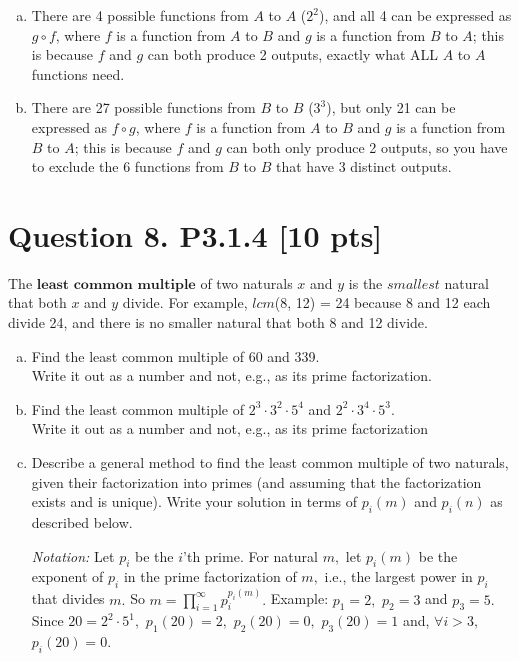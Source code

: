 \documentclass[12pt]{article}
\begin{document}
\begin{enumerate}[(a)]
\begin{enumerate}[1.]
				\item $\{(x,w),(y,w),(z,v)\}$ -- surjection

				\item $\{(x,w),(y,w),(z,w)\}$ -- NOT surjection
			\end{enumerate}

		\item There are 4 possible functions from $A$ to $A$ ($2^{2}$), and all 4
			can be expressed as $g \circ f$, where $f$ is a function from $A$ to $B$ and
			$g$ is a function from $B$ to $A$; this is because $f$ and $g$ can both
			produce 2 outputs, exactly what ALL $A$ to $A$ functions need.

		\item There are 27 possible functions from $B$ to $B$ ($3^{3}$), but only 21
			can be expressed as $f \circ g$, where $f$ is a function from $A$ to $B$ and
			$g$ is a function from $B$ to $A$; this is because $f$ and $g$ can both
			only produce 2 outputs, so you have to exclude the 6 functions from $B$ to
			$B$ that have 3 distinct outputs.
	\end{enumerate}

	\newpage

	\section*{\textbf{Question 8. P3.1.4} [10 pts]}
	The $\textbf{least common multiple}$ of two naturals $x$ and $y$ is the
	$smalle st$ natural that both $x$ and $y$ divide. For example, $lcm$(8, 12) =
	24 because 8 and 12 each divide 24, and there is no smaller natural that both 8
	and 12 divide.
	\begin{enumerate}[(a)]
		\item Find the least common multiple of 60 and 339. \\
			Write it out as a number and not, e.g., as its prime factorization.

		\item Find the least common multiple of $2^{3}\cdot 3^{2}\cdot 5^{4}$ and $2^{2}
			\cdot 3^{4}\cdot 5^{3}$. \\
			Write it out as a number and not, e.g., as its prime factorization

		\item Describe a general method to find the least common multiple of two naturals,
			given their factorization into primes (and assuming that the factorization
			exists and is unique). Write your solution in terms of $p_{i}(m)$ and $p_{i}
			(n)$ as described below.

			{\em Notation:} Let $p_{i}$ be the $i$'th prime. For natural $m,$ let
			$p_{i}(m)$ be the exponent of $p_{i}$ in the prime factorization of $m,$ i.e.,
			the largest power in $p_{i}$ that divides $m.$ So
			$m= \prod_{i=1}^{\infty}p_{i}^{p_i(m)}.$ Example: $p_{1}=2,$ $p_{2}=3$ and
			$p_{3}=5.$ Since $20= 2^{2}\cdot 5^{1},$ $p_{1}(20)=2,$ $p_{2}(20)=0,$ $p_{3}
			(20)=1$ and, $\forall i > 3,$ $p_{i}(20)=0.$
	\end{enumerate}
\end{document}
